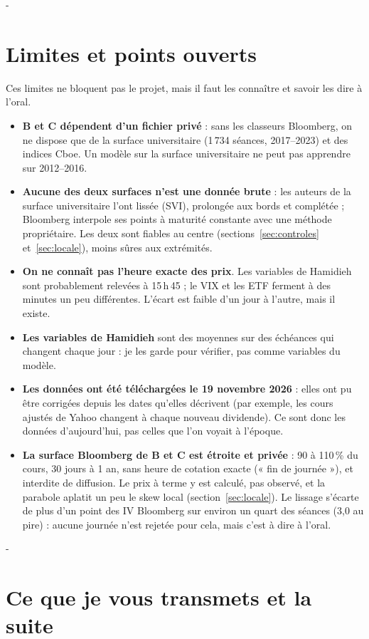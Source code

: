 \documentclass[10pt,a4paper]{article}
\makeatletter
\newcommand{\besoin}[1]{\par\penalty-100\begingroup\setlength{\dimen@}{#1}%
  \dimen@ii\pagegoal\advance\dimen@ii-\pagetotal
  \ifdim\dimen@>\dimen@ii\ifdim\dimen@ii>\z@\vfil\fi\break\fi\endgroup}
\let\sectionorigine\section
\renewcommand{\section}{\besoin{6\baselineskip}\sectionorigine}
\makeatother
\begin{document}
\section{Limites et points ouverts}
Ces limites ne bloquent pas le projet, mais il faut les connaître et savoir les dire à l'oral.
\begin{itemize}
\item \textbf{B et C dépendent d'un fichier privé} : sans les classeurs Bloomberg, on ne dispose que de la surface universitaire (1\,734 séances, 2017–2023) et des indices Cboe. Un modèle sur la surface universitaire ne peut pas apprendre sur 2012–2016.
\item \textbf{Aucune des deux surfaces n'est une donnée brute} : les auteurs de la surface universitaire l'ont lissée (SVI), prolongée aux bords et complétée ; Bloomberg interpole ses points à maturité constante avec une méthode propriétaire. Les deux sont fiables au centre (sections~\ref{sec:controles} et~\ref{sec:locale}), moins sûres aux extrémités.
\item \textbf{On ne connaît pas l'heure exacte des prix}. Les variables de Hamidieh sont probablement relevées à 15\,h\,45 ; le VIX et les ETF ferment à des minutes un peu différentes. L'écart est faible d'un jour à l'autre, mais il existe.
\item \textbf{Les variables de Hamidieh} sont des moyennes sur des échéances qui changent chaque jour : je les garde pour vérifier, pas comme variables du modèle.
\item \textbf{Les données ont été téléchargées le 19 novembre 2026} : elles ont pu être corrigées depuis les dates qu'elles décrivent (par exemple, les cours ajustés de Yahoo changent à chaque nouveau dividende). Ce sont donc les données d'aujourd'hui, pas celles que l'on voyait à l'époque.
\item \textbf{La surface Bloomberg de B et C est étroite et privée} : 90 à 110\,\% du cours, 30 jours à 1 an, sans heure de cotation exacte (« fin de journée »), et interdite de diffusion. Le prix à terme y est calculé, pas observé, et la parabole aplatit un peu le skew local (section~\ref{sec:locale}). Le lissage s'écarte de plus d'un point des IV Bloomberg sur environ un quart des séances (3,0 au pire) : aucune journée n'est rejetée pour cela, mais c'est à dire à l'oral.
\end{itemize}

\section{Ce que je vous transmets et la suite}\label{sec:suite}
\end{document}
